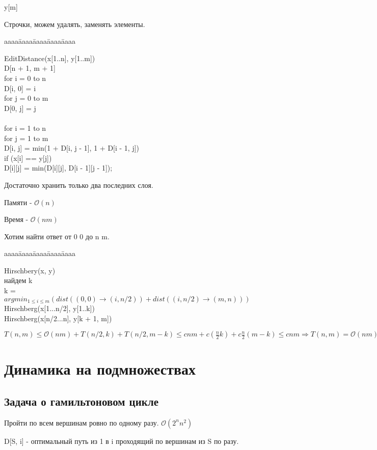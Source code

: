 \documentclass[12pt]{article}
\def\t{\texttt}
\def\O{\mathcal{O}}
\newenvironment{MyTabbing}{
\t\bgroup
\begin{tabbing}
aaaa\=aaaa\=aaaa\=aaaa\=aaaa\kill
}{
\end{tabbing}
\t\egroup
}
\begin{document}
y[m]

Строчки, можем удалять, заменять элементы.

\begin{MyTabbing}
EditDistance(x[1..n], y[1..m])\\
D[n + 1, m + 1]\\
for i = 0 to n\\
\>D[i, 0] = i\\
for j = 0 to m\\
\>D[0, j] = j\\
\\
for i = 1 to n\\
\>for j = 1 to m\\
\>\>D[i, j] = min(1 + D[i, j - 1], 1 + D[i - 1, j])\\
\>\>if (x[i] == y[j])\\
\>\>\>D[i][j] = min(D[i][j], D[i - 1][j - 1]);\\
\end{MyTabbing}

Достаточно хранить только два последних слоя. 

Памяти - $\O(n)$

Время - $\O(nm)$

Хотим найти ответ от 0 0 до n m.

\begin{MyTabbing}
Hirschbery(x, y)\\
\>найдем k\\
\>k = $argmin_{1 \le i \le m}(dist((0, 0) \to (i, n/2)) + dist((i, n/2) \to (m, n)))$\\
\>Hirschberg(x[1...n/2], y[1..k])\\
\>Hirschberg(x[n/2...n], y[k + 1, m])\\
\end{MyTabbing}

$T(n, m) \le \O(nm) + T(n/2, k) + T(n/2, m - k) \le cnm + c(\frac{n}{2} k) + c\frac{n}{2}(m - k) \le c nm \Rightarrow T(n, m) = \O(nm)$

\section{Динамика на подмножествах}
\subsection{Задача о гамильтоновом цикле}

Пройти по всем вершинам ровно по одному разу. $\O(2^nn^2)$

D[S, i] - оптимальный путь из  1 в i проходящий по вершинам из S по разу.
\end{document}
